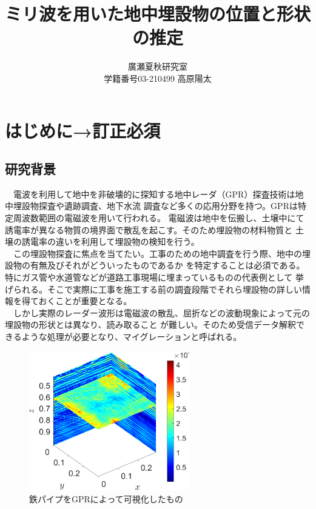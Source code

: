 \documentclass[a4paper,12pt]{jsreport}
\title{ミリ波を用いた地中埋設物の位置と形状の推定}
\author{廣瀬夏秋研究室\\
学籍番号03-210499 高原陽太}
\begin{document}
\maketitle
\tableofcontents
\clearpage
\chapter{はじめに→訂正必須}
\section{研究背景}
　電波を利用して地中を非破壊的に探知する地中レーダ（GPR）探査技術は地中埋設物探査や遺跡調査、地下水流
調査など多くの応用分野を持つ\cite{radar1}\cite{radar2}。GPRは特定周波数範囲の電磁波を用いて行われる。
電磁波は地中を伝搬し、土壌中にて誘電率が異なる物質の境界面で散乱を起こす。そのため埋設物の材料物質と
土壌の誘電率の違いを利用して埋設物の検知を行う。
\\　この埋設物探査に焦点を当てたい。工事のための地中調査を行う際、地中の埋設物の有無及びそれがどういったものであるか
を特定することは必須である。特にガス管や水道管などが道路工事現場に埋まっているものの代表例として
挙げられる。そこで実際に工事を施工する前の調査段階でそれら埋設物の詳しい情報を得ておくことが重要となる。
\\　しかし実際のレーダー波形は電磁波の散乱、屈折などの波動現象によって元の埋設物の形状とは異なり、読み取ること
が難しい。そのため受信データ解釈できるような処理が必要となり、マイグレーションと呼ばれる。


\begin{figure}[h]
  \begin{center}
   \includegraphics[width=7cm]{./image/0918.png}
   
  \caption{鉄パイプをGPRによって可視化したもの}\label{鉄パイプをGPRによって可視化したもの}
  \end{center}
  \end{figure}
\end{document}
